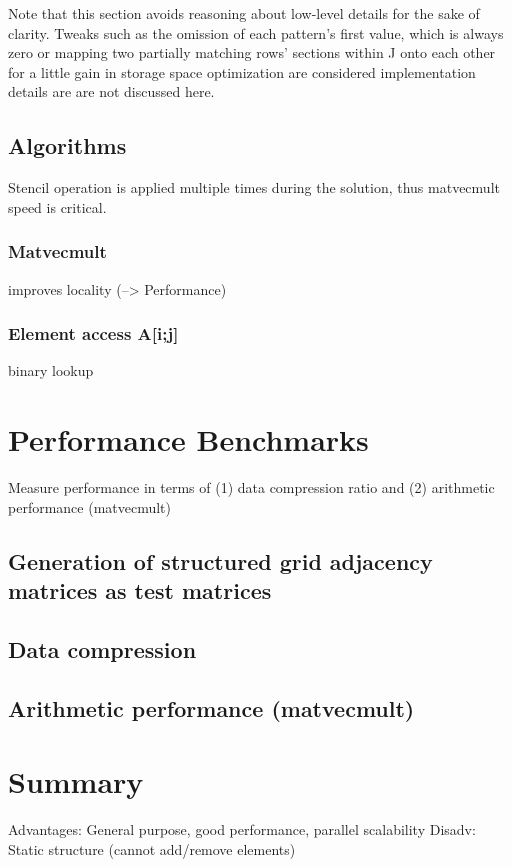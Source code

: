 \documentclass{article}
\begin{document}
    Note that this section avoids reasoning about low-level details for the sake of clarity. Tweaks such as the omission
    of each pattern's first value, which is always zero or mapping two partially matching rows' sections within J onto
    each other for a little gain in storage space optimization are considered implementation details are are not discussed
    here.

  \subsection{Algorithms}

    Stencil operation is applied multiple times during the solution, thus matvecmult speed is critical.

    \subsubsection{Matvecmult}

      improves locality (--> Performance)

    \subsubsection{Element access A[i;j]}
      binary lookup
\section{Performance Benchmarks}
  Measure performance in terms of (1) data compression ratio and (2) arithmetic performance (matvecmult)

  \subsection{Generation of structured grid adjacency matrices as test matrices}

  \subsection{Data compression}

  \subsection{Arithmetic performance (matvecmult)}

\section{Summary}
  Advantages: General purpose, good performance, parallel scalability
  Disadv: Static structure (cannot add/remove elements)

\printbibliography
\end{document}
